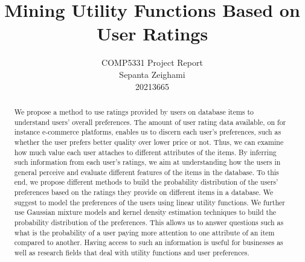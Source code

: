 \documentclass{template}
\begin{document}
\newcommand\MyHead[2]{%
	\multicolumn{1}{| c |}{\parbox{#1}{\centering #2}}
}

\makeatletter
\patchcmd{\maketitle}{\@copyrightspace}{}{}{}
\setlength{\@fptop}{5pt}
\makeatother

	\title{Mining Utility Functions Based on User Ratings}
	\author{COMP5331 Project Report\\Sepanta Zeighami\\20213665}
    \maketitle

\begin{sloppy}
	\begin{abstract}
		We propose a method to use ratings provided by users on database items to understand users' overall preferences. The amount of user rating data available, on for instance e-commerce platforms, enables us to discern each user's preferences, such as whether the user prefers better quality over lower price or not. Thus, we can examine how much value each user attaches to different attributes of the items. By inferring such information from each user's ratings, we aim at understanding how the users in general perceive and evaluate different features of the items in the database. To this end, we propose different methods to build the probability distribution of the users' preferences based on the ratings they provide on different items in a database. We suggest to model the preferences of the users using linear utility functions. We further use Gaussian mixture models and kernel density estimation techniques to build the probability distribution of the preferences. This allows us to answer questions such as what is the probability of a user paying more attention to one attribute of an item compared to another. Having access to such an information is useful for businesses as well as research fields that deal with utility functions and user preferences.
	\end{abstract}
	








	

		
	
	
\end{sloppy}
\end{document}
